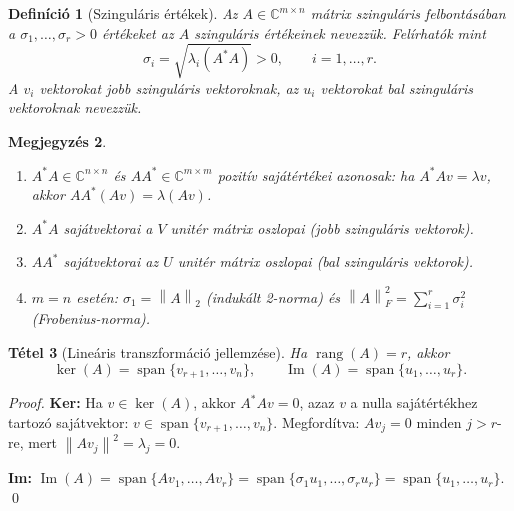 \documentclass[a4paper,12pt]{article}
\theoremstyle{mydef}
\newtheorem{tetel}{Tétel}[section]
\newtheorem{definicio}[tetel]{Definíció}
\newtheorem{megjegyzes}[tetel]{Megjegyzés}
\newcommand{\C}{\mathbb{C}}
\newcommand{\norm}[1]{\left\|#1\right\|}
\DeclareMathOperator{\rang}{rang}
\DeclareMathOperator{\Ker}{ker}
\DeclareMathOperator{\Kep}{Im}
\DeclareMathOperator{\Span}{span}
\begin{document}
\begin{mdframed}[backgroundcolor=defbg,linewidth=0pt,innertopmargin=8pt,innerbottommargin=8pt]
\begin{definicio}[Szinguláris értékek]
Az $A \in \C^{m\times n}$ mátrix szinguláris felbontásában a $\sigma_1, \ldots, \sigma_r > 0$
értékeket az $A$ \emph{szinguláris értékeinek} nevezzük. Felírhatók mint
\[
  \sigma_i = \sqrt{\lambda_i(A^*A)} > 0, \qquad i = 1, \ldots, r.
\]
A $v_i$ vektorokat \emph{jobb szinguláris vektoroknak}, az $u_i$ vektorokat
\emph{bal szinguláris vektoroknak} nevezzük.
\end{definicio}
\end{mdframed}

\begin{megjegyzes}
\leavevmode
\begin{enumerate}[noitemsep,topsep=2pt]
  \item $A^*A \in \C^{n\times n}$ és $AA^* \in \C^{m\times m}$ pozitív sajátértékei
        \emph{azonosak}: ha $A^*Av = \lambda v$, akkor $AA^*(Av) = \lambda(Av)$.
  \item $A^*A$ sajátvektorai a $V$ unitér mátrix oszlopai (jobb szinguláris vektorok).
  \item $AA^*$ sajátvektorai az $U$ unitér mátrix oszlopai (bal szinguláris vektorok).
  \item $m = n$ esetén: $\sigma_1 = \norm{A}_2$ (indukált 2-norma) és
        $\norm{A}_F^2 = \sum_{i=1}^r \sigma_i^2$ (Frobenius-norma).
\end{enumerate}
\end{megjegyzes}

\begin{mdframed}[backgroundcolor=thmbg,linewidth=0pt,innertopmargin=8pt,innerbottommargin=8pt]
\begin{tetel}[Lineáris transzformáció jellemzése]
\label{tetel:lintrafo}
Ha $\rang(A) = r$, akkor
\[
  \Ker(A) = \Span\{v_{r+1}, \ldots, v_n\}, \qquad
  \Kep(A) = \Span\{u_1, \ldots, u_r\}.
\]
\end{tetel}
\end{mdframed}

\begin{proof}
\textbf{Ker:} Ha $v \in \Ker(A)$, akkor $A^*Av = 0$, azaz $v$ a nulla sajátértékhez tartozó
sajátvektor: $v \in \Span\{v_{r+1},\ldots,v_n\}$. Megfordítva: $Av_j = 0$ minden $j > r$-re,
mert $\norm{Av_j}^2 = \lambda_j = 0$.

\textbf{Im:} $\Kep(A) = \Span\{Av_1,\ldots,Av_r\} = \Span\{\sigma_1 u_1,\ldots,\sigma_r u_r\}
= \Span\{u_1,\ldots,u_r\}$. \qed
\end{proof}
\end{document}
